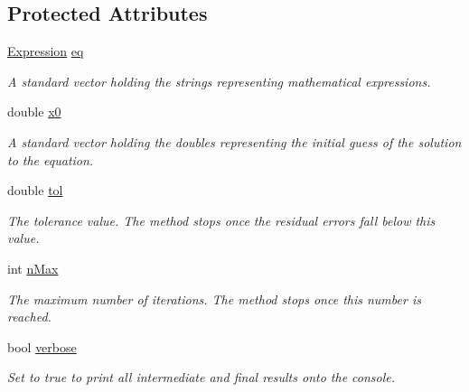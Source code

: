 \subsection*{Protected Attributes}
\begin{DoxyCompactItemize}
\item 
\hyperlink{class_expression}{Expression} \hyperlink{class_nonlinear_solver_aad588fc96d07cf310a13ae11b51ce550}{eq}\hypertarget{class_nonlinear_solver_aad588fc96d07cf310a13ae11b51ce550}{}\label{class_nonlinear_solver_aad588fc96d07cf310a13ae11b51ce550}

\begin{DoxyCompactList}\small\item\em A standard vector holding the strings representing mathematical expressions. \end{DoxyCompactList}\item 
double \hyperlink{class_nonlinear_solver_a0af503b5f79fd74a61b1ba8c956e9a06}{x0}\hypertarget{class_nonlinear_solver_a0af503b5f79fd74a61b1ba8c956e9a06}{}\label{class_nonlinear_solver_a0af503b5f79fd74a61b1ba8c956e9a06}

\begin{DoxyCompactList}\small\item\em A standard vector holding the doubles representing the initial guess of the solution to the equation. \end{DoxyCompactList}\item 
double \hyperlink{class_nonlinear_solver_a8fa50d85cb58f69da6cddf52a2b950af}{tol}\hypertarget{class_nonlinear_solver_a8fa50d85cb58f69da6cddf52a2b950af}{}\label{class_nonlinear_solver_a8fa50d85cb58f69da6cddf52a2b950af}

\begin{DoxyCompactList}\small\item\em The tolerance value. The method stops once the residual errors fall below this value. \end{DoxyCompactList}\item 
int \hyperlink{class_nonlinear_solver_accd5129e5d683f9d8187bd9d4d13b023}{n\+Max}\hypertarget{class_nonlinear_solver_accd5129e5d683f9d8187bd9d4d13b023}{}\label{class_nonlinear_solver_accd5129e5d683f9d8187bd9d4d13b023}

\begin{DoxyCompactList}\small\item\em The maximum number of iterations. The method stops once this number is reached. \end{DoxyCompactList}\item 
bool \hyperlink{class_nonlinear_solver_a81db23a90d44eeea9b9ec57d8ea94155}{verbose}\hypertarget{class_nonlinear_solver_a81db23a90d44eeea9b9ec57d8ea94155}{}\label{class_nonlinear_solver_a81db23a90d44eeea9b9ec57d8ea94155}

\begin{DoxyCompactList}\small\item\em Set to true to print all intermediate and final results onto the console. \end{DoxyCompactList}\end{DoxyCompactItemize}


